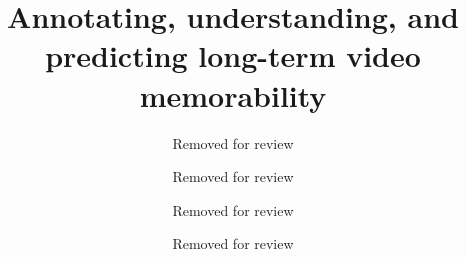\documentclass[sigconf]{acmart}
\begin{document}

\title{Annotating, understanding, and predicting long-term video memorability}





\author{Removed for review}
\author{Removed for review}
\author{Removed for review}
\author{Removed for review}


\renewcommand{\shortauthors}{R. Cohendet et al.}
\end{document}
